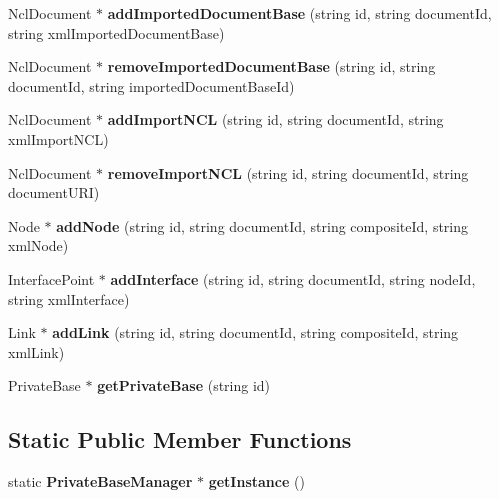 \begin{CompactItemize}
\item 
NclDocument $\ast$ \textbf{addImportedDocumentBase} (string id, string documentId, string xmlImportedDocumentBase)\label{classbr_1_1pucrio_1_1telemidia_1_1ginga_1_1ncl_1_1PrivateBaseManager_e302df276c929adf3c204a893b1dcd39}

\item 
NclDocument $\ast$ \textbf{removeImportedDocumentBase} (string id, string documentId, string importedDocumentBaseId)\label{classbr_1_1pucrio_1_1telemidia_1_1ginga_1_1ncl_1_1PrivateBaseManager_542c8fa73501fb88cffb92f42bb9b56d}

\item 
NclDocument $\ast$ \textbf{addImportNCL} (string id, string documentId, string xmlImportNCL)\label{classbr_1_1pucrio_1_1telemidia_1_1ginga_1_1ncl_1_1PrivateBaseManager_c19201202d548f3cd026f843c7fd6ec6}

\item 
NclDocument $\ast$ \textbf{removeImportNCL} (string id, string documentId, string documentURI)\label{classbr_1_1pucrio_1_1telemidia_1_1ginga_1_1ncl_1_1PrivateBaseManager_c7481ba09547c9afbbbb4d6732a20ce9}

\item 
Node $\ast$ \textbf{addNode} (string id, string documentId, string compositeId, string xmlNode)\label{classbr_1_1pucrio_1_1telemidia_1_1ginga_1_1ncl_1_1PrivateBaseManager_9c8b6752de3a227a33834924283521d7}

\item 
InterfacePoint $\ast$ \textbf{addInterface} (string id, string documentId, string nodeId, string xmlInterface)\label{classbr_1_1pucrio_1_1telemidia_1_1ginga_1_1ncl_1_1PrivateBaseManager_a053b1a0e25b0b8be1a008269e7403ec}

\item 
Link $\ast$ \textbf{addLink} (string id, string documentId, string compositeId, string xmlLink)\label{classbr_1_1pucrio_1_1telemidia_1_1ginga_1_1ncl_1_1PrivateBaseManager_84b003bf5e9b9f15fd5f56751527406e}

\item 
PrivateBase $\ast$ \textbf{getPrivateBase} (string id)\label{classbr_1_1pucrio_1_1telemidia_1_1ginga_1_1ncl_1_1PrivateBaseManager_ebf9c47da41f37c9c536c432803c94e1}

\end{CompactItemize}
\subsection*{Static Public Member Functions}
\begin{CompactItemize}
\item 
static {\bf PrivateBaseManager} $\ast$ \textbf{getInstance} ()\label{classbr_1_1pucrio_1_1telemidia_1_1ginga_1_1ncl_1_1PrivateBaseManager_0609eaff8aa5d2a006b3d0819aed372d}

\end{CompactItemize}
